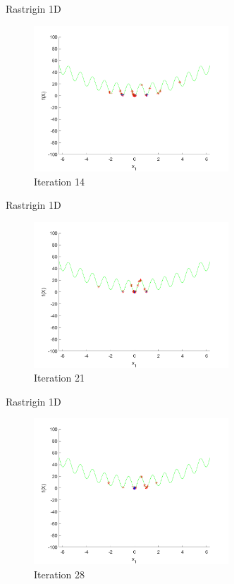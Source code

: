 \documentclass[xcolor=table]{beamer}
\begin{document}
\begin{frame}{Rastrigin 1D}
  \begin{figure}[h]
  \begin{center}
    \includegraphics[width=0.65\textwidth]{img/smpl/rast1d/loa-iter-14}
    \caption{Iteration 14}
  \end{center}
  \end{figure}
\end{frame}
\begin{frame}{Rastrigin 1D}
  \begin{figure}[h]
  \begin{center}
    \includegraphics[width=0.65\textwidth]{img/smpl/rast1d/loa-iter-21}
    \caption{Iteration 21}
  \end{center}
  \end{figure}
\end{frame}
\begin{frame}{Rastrigin 1D}
  \begin{figure}[h]
  \begin{center}
    \includegraphics[width=0.65\textwidth]{img/smpl/rast1d/loa-iter-28}
    \caption{Iteration 28}
  \end{center}
  \end{figure}
\end{frame}
\end{document}
